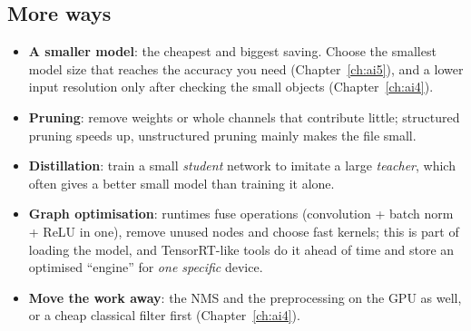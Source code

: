 \subsection*{More ways}
\begin{itemize}[nosep]
\item \textbf{A smaller model}: the cheapest and biggest saving. Choose the smallest model size that reaches the accuracy you need (Chapter~\ref{ch:ai5}), and a lower input resolution only after checking the small objects (Chapter~\ref{ch:ai4}).
\item \textbf{Pruning}: remove weights or whole channels that contribute little; structured pruning speeds up, unstructured pruning mainly makes the file small.
\item \textbf{Distillation}: train a small \emph{student} network to imitate a large \emph{teacher}, which often gives a better small model than training it alone.
\item \textbf{Graph optimisation}: runtimes fuse operations (convolution + batch norm + ReLU in one), remove unused nodes and choose fast kernels; this is part of loading the model, and TensorRT-like tools do it ahead of time and store an optimised ``engine'' for \emph{one specific} device.
\item \textbf{Move the work away}: the NMS and the preprocessing on the GPU as well, or a cheap classical filter first (Chapter~\ref{ch:ai4}).
\end{itemize}


